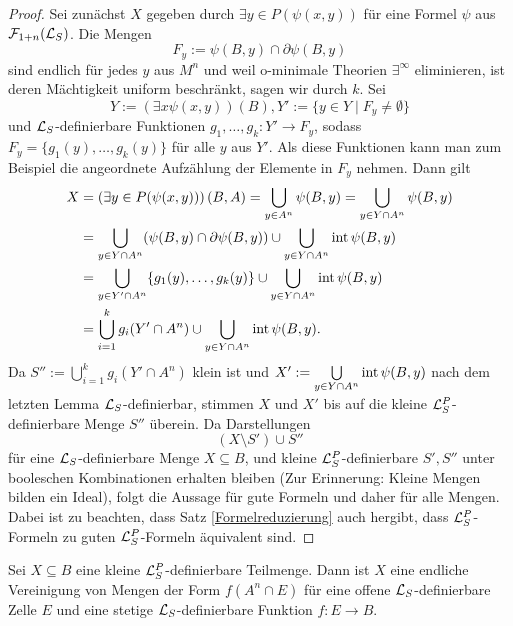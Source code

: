 \begin{proof}
	Sei zunächst $X$ gegeben durch $\exists y\in P(\psi(x,y))$ für eine Formel $\psi$ aus $\mathcal{F}_{1+n}(\mathcal{L}_S)$. Die Mengen $$F_y:=\psi(B,y)\cap\partial\psi(B,y)$$ sind endlich für jedes $y$ aus $M^n$ und weil o-minimale Theorien $\exists^\infty$ eliminieren, ist deren Mächtigkeit uniform beschränkt, sagen wir durch $k$. Sei $$Y:=(\exists x\psi(x,y))(B),Y':=\{y\in Y\mid F_y\neq\emptyset\}$$ und $\mathcal{L}_S$-definierbare Funktionen $g_1,\dots,g_k:Y'\rightarrow F_y$, sodass $F_y=\{g_1(y),\dots,g_k(y)\}$ für alle $y$ aus $Y'$. Als diese Funktionen kann man zum Beispiel die angeordnete Aufzählung der Elemente in $F_y$ nehmen. Dann gilt
	\begin{align*}
	X&=\left(\exists y\in P(\psi(x,y))\right)(B,A)=\bigcup\limits_{y\in A^n}\psi(B,y)=\bigcup\limits_{y\in Y\cap A^n}\psi(B,y)\\&=\bigcup\limits_{y\in Y\cap A^n}(\psi(B,y)\cap \partial\psi(B,y))\cup\bigcup\limits_{y\in Y\cap A^n}\operatorname{int}\psi(B,y)\\&=\bigcup\limits_{y\in Y'\cap A^n}\{g_1(y),\dots,g_k(y)\}\cup\bigcup\limits_{y\in Y\cap A^n}\operatorname{int}\psi(B,y)\\&=\bigcup\limits_{i=1}^kg_i(Y'\cap A^n)\cup \bigcup\limits_{y\in Y\cap A^n}\operatorname{int}\psi(B,y).
	\end{align*}
	Da $S'':=\bigcup\limits_{i=1}^kg_i(Y'\cap A^n)$ klein ist und $X':=\bigcup\limits_{y\in Y\cap A^n}\operatorname{int}\psi(B,y)$ nach dem letzten Lemma $\mathcal{L}_S$-definierbar, stimmen $X$ und $X'$ bis auf die kleine $\mathcal{L}^P_S$-definierbare Menge $S''$ überein. Da Darstellungen $$(X\setminus  S')\cup S''$$ für eine $\mathcal{L}_S$-definierbare Menge $X\subseteq B$, und kleine $\mathcal{L}^P_S$-definierbare $S',S''$ unter booleschen Kombinationen erhalten bleiben (Zur Erinnerung: Kleine Mengen bilden ein Ideal), folgt die Aussage für gute Formeln und daher für alle Mengen. Dabei ist zu beachten, dass Satz \ref{Formelreduzierung} auch hergibt, dass $\mathcal{L}^P_S$-Formeln zu guten $\mathcal{L}^P_S$-Formeln äquivalent sind.
\end{proof}
\newpage
\begin{lemma}
	Sei $X\subseteq B$ eine kleine $\mathcal{L}^P_S$-definierbare Teilmenge. Dann ist $X$ eine endliche Vereinigung von Mengen der Form $f(A^n\cap E)$ für eine offene $\mathcal{L}_S$-definierbare Zelle $E$ und eine stetige $\mathcal{L}_S$-definierbare Funktion $f:E\rightarrow B$.
\end{lemma}
